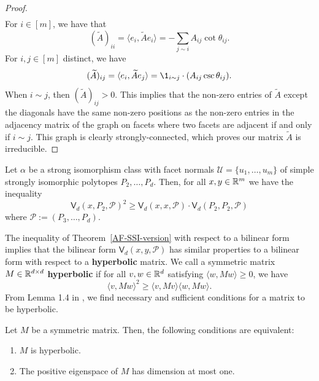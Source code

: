 \documentclass{puthesis-UG}
\begin{document}
\begin{proof}
\begin{align*}
	\end{align*}
	For $i \in [m]$, we have that 
	\[
		(\widetilde{A})_{ii} = \langle e_i, \widetilde{A}e_i \rangle = - \sum_{j \sim i} A_{ij} \cot \theta_{ij}.
	\]
	For $i, j \in [m]$ distinct, we have 
	\[
		(\widetilde{A})_{ij} = \langle e_i, \widetilde{A}e_j \rangle = \1_{i \sim j} \cdot (A_{ij} \csc \theta_{ij}).
	\]
	When $i \sim j$, then $(\widetilde{A})_{ij} > 0$. This implies that the non-zero entries of $\widetilde{A}$ except the diagonals have the same non-zero positions as the non-zero entries in the adjacency matrix of the graph on facets where two facets are adjacent if and only if $i \sim j$. This graph is clearly strongly-connected, which proves our matrix $\widetilde{A}$ is irreducible. 
\end{proof}

\begin{thm} \label{AF-SSI-version}
	Let $\alpha$ be a strong isomorphism class with facet normals $\mathcal{U} = \{u_1, \ldots, u_m\}$ of simple strongly isomorphic polytopes $P_2, \ldots, P_d$. Then, for all $x, y \in \mathbb{R}^m$ we have the inequality
	\[
		\mathsf{V}_d (x, P_2, \mathcal{P})^2 \geq \mathsf{V}_d (x, x, \mathcal{P}) \cdot \mathsf{V}_d (P_2, P_2, \mathcal{P})
	\]
	where $\mathcal{P} := (P_3, \ldots, P_{d})$.
\end{thm}

The inequality of Theorem~\ref{AF-SSI-version} with respect to a bilinear form implies that the bilinear form $\mathsf{V}_d (x, y, \mathcal{P})$ has similar properties to a bilinear form with respect to a \textbf{hyperbolic} matrix. We call a symmetric matrix $M \in \mathbb{R}^{d \times d}$ \textbf{hyperbolic} if for all $v, w \in \mathbb{R}^d$ satisfying $\langle w, Mw \rangle \geq 0$, we have 
\[
		\langle v, Mw \rangle^2 \geq \langle v, Mv \rangle \langle w, M w \rangle. 
\]
From Lemma 1.4 in \cite{bochner}, we find necessary and sufficient conditions for a matrix to be hyperbolic. 

\begin{lem} \label{hyperbolic-quadratic-forms}
	Let $M$ be a symmetric matrix. Then, the following conditions are equivalent:
	\begin{enumerate}[label = (\alph*)]
		\item $M$ is hyperbolic. 

		\item The positive eigenspace of $M$ has dimension at most one. 
	\end{enumerate}
\end{lem}
\end{document}
